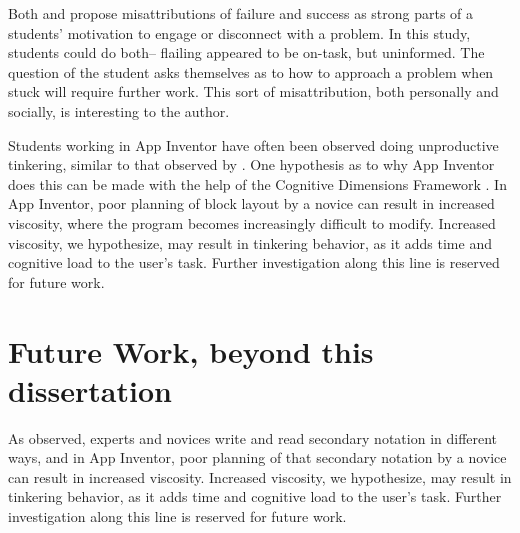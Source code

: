 Both \citeauthor{wilson-2002} and \citeauthor{baker2004off} propose misattributions of failure and success as strong parts of a students' motivation to engage or disconnect with a problem. In this study, students could do both-- flailing appeared to be on-task, but uninformed. The question of the student asks themselves as to how to approach a problem when stuck will require further work. This sort of misattribution, both personally and socially, is interesting to the author.

Students working in App Inventor have often been observed doing unproductive tinkering, similar to that observed by \citet{perkins-1986}. One hypothesis as to why App Inventor does this can be made with the help of the Cognitive Dimensions Framework \citep{blackwell-2003}. In App Inventor, poor planning of block layout by a novice can result in increased viscosity, where the program becomes increasingly difficult to modify. Increased viscosity, we hypothesize, may result in tinkering behavior, as it adds time and cognitive load to the user's task. Further investigation along this line is reserved for future work.

	




 \section{Future Work, beyond this dissertation} %
\label{sec:futurework}


As \citet{petre-2006} observed, experts and novices write and read secondary notation in different ways, and in App Inventor, poor planning of that secondary notation by a novice can result in increased viscosity. Increased viscosity, we hypothesize, may result in tinkering behavior, as it adds time and cognitive load to the user's task. Further investigation along this line is reserved for future work.

